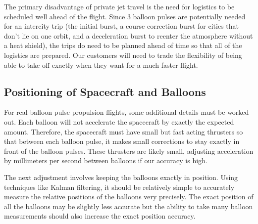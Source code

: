 \documentclass{article}
\begin{document}
The primary disadvantage of private jet travel is the need for logistics to be scheduled well ahead of the flight.   Since 3 balloon pulses are potentially needed for an intercity trip (the initial burst, a course correction burst for cities that don't lie on one orbit, and a deceleration burst to reenter the atmosphere without a heat shield), the trips do need to be planned ahead of time so that all of the logistics are prepared.   Our customers will need to trade the flexibility of being able to take off exactly when they want for a much faster flight.   

\subsection{Positioning of Spacecraft and Balloons}\label{sec:balloon_positioning}
For real balloon pulse propulsion flights, some additional details must be worked out.   Each balloon will not accelerate the spacecraft by exactly the expected amount.   Therefore, the spacecraft must have small but fast acting thrusters so that between each balloon pulse, it makes small corrections to stay exactly in front of the balloon pulses.    These thrusters are likely small, adjusting acceleration by millimeters per second between balloons if our accuracy is high.

The next adjustment involves keeping the balloons exactly in position.  Using techniques like Kalman filtering, it should be relatively simple to accurately measure the relative positions of the balloons very precisely.   The exact position of all the balloons may be slightly less accurate but the ability to take many balloon measurements should also increase the exact position accuracy.   
\end{document}
